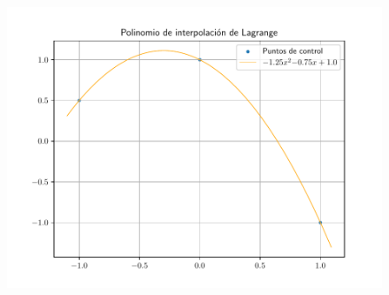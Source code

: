 \begin{frame}
	\begin{solution}
		\begin{figure}[ht!]
			\centering
			\includegraphics[width=.8\paperwidth]{p6}
		\end{figure}
	\end{solution}
\end{frame}